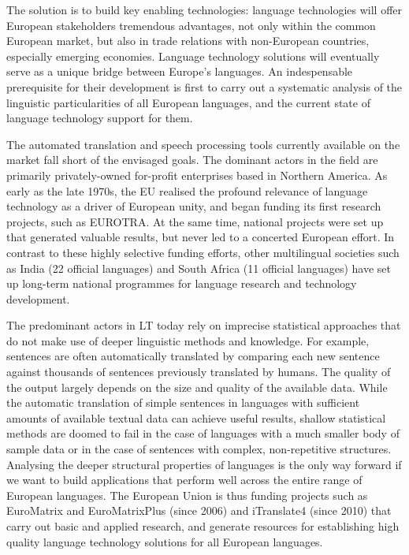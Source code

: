 \documentclass{../../metanetpaper}
\begin{document}
\begin{multicols}{2}
The solution is to build key enabling technologies: language technologies will offer European stakeholders tremendous advantages, not only within the common European market, but also in trade relations with non-European countries, especially emerging economies. Language technology solutions will eventually serve as a unique bridge between Europe's languages. An indespensable prerequisite for their development is first to carry out a systematic analysis of the linguistic particularities of all European languages, and the current state of language technology support for them.  

The automated translation and speech processing tools currently available on the market fall short of the envisaged goals. The dominant actors in the field are primarily privately-owned for-profit enterprises based in Northern America. As early as the late 1970s, the EU realised the profound relevance of language technology as a driver of European unity, and began funding its first research projects, such as EUROTRA. At the same time, national projects were set up that generated valuable results, but never led to a concerted European effort. In contrast to these highly selective funding efforts, other multilingual societies such as India (22 official languages) and South Africa (11 official languages) have set up long-term national programmes for language research and technology development. 

The predominant actors in LT today rely on imprecise statistical approaches that do not make use of deeper linguistic methods and knowledge. For example, sentences are often automatically translated by comparing each new sentence against thousands of sentences previously translated by humans. The quality of the output largely depends on the size and quality of the available data. While the automatic translation of simple sentences in languages with sufficient amounts of available textual data can achieve useful results, shallow statistical methods are doomed to fail in the case of languages with a much smaller body of sample data or in the case of sentences with complex, non-repetitive structures. Analysing the deeper structural properties of languages is the only way forward if we want to build applications that perform well across the entire range of European languages.
The European Union is thus funding projects such as EuroMatrix and EuroMatrixPlus (since 2006) and iTranslate4 (since 2010) that carry out basic and applied research, and generate resources for establishing high quality language technology solutions for all European languages. 


\end{multicols}
\end{document}
